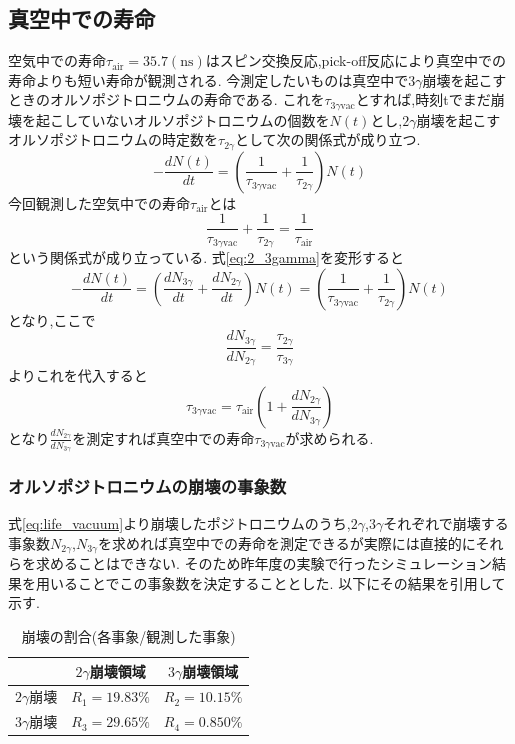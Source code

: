 \subsection{真空中での寿命}
空気中での寿命$\tau_\textrm{air}=35.7(\textrm{ns})$はスピン交換反応,pick-off反応により真空中での寿命よりも短い寿命が観測される.
今測定したいものは真空中で$3\gamma$崩壊を起こすときのオルソポジトロニウムの寿命である.
これを$\tau_{3\gamma\textrm{vac}}$とすれば,時刻tでまだ崩壊を起こしていないオルソポジトロニウムの個数を$N(t)$とし,$2\gamma$崩壊を起こすオルソポジトロニウムの時定数を$\tau_{2\gamma}$として次の関係式が成り立つ.
\begin{equation}
	-\frac{dN(t)}{dt}=\left(\frac{1}{\tau_{3\gamma\textrm{vac}}}+\frac{1}{\tau_{2\gamma}}\right)N(t)
	\label{eq:2_3gamma}
\end{equation}
今回観測した空気中での寿命$\tau_\textrm{air}$とは
\begin{equation}
	\nonumber
	\frac{1}{\tau_{3\gamma\textrm{vac}}}+\frac{1}{\tau_{2\gamma}}=\frac{1}{\tau_\textrm{air}}
\end{equation}
という関係式が成り立っている.
式\ref{eq:2_3gamma}を変形すると
\begin{equation}
	\nonumber
	-\frac{dN(t)}{dt}=\left(\frac{dN_{3\gamma}}{dt}+\frac{dN_{2\gamma}}{dt}\right)N(t)=\left(\frac{1}{\tau_{3\gamma\textrm{vac}}}+\frac{1}{\tau_{2\gamma}}\right)N(t)
\end{equation}
となり,ここで
\begin{equation}
	\nonumber
	\frac{dN_{3\gamma}}{dN_{2\gamma}}=\frac{\tau_{2\gamma}}{\tau_{3\gamma}}
\end{equation}
よりこれを代入すると
\begin{equation}
	\tau_{3\gamma\textrm{vac}}=\tau_\textrm{air}\left(1+\frac{dN_{2\gamma}}{dN_{3\gamma}}\right)
	\label{eq:life_vacuum}
\end{equation}
となり$\frac{dN_{2\gamma}}{dN_{3\gamma}}$を測定すれば真空中での寿命$\tau_{3\gamma \textrm{vac}}$が求められる.

\subsubsection{オルソポジトロニウムの崩壊の事象数}
式\ref{eq:life_vacuum}より崩壊したポジトロニウムのうち,$2\gamma$,$3\gamma$それぞれで崩壊する事象数$N_{2\gamma}$,$N_{3\gamma}$を求めれば真空中での寿命を測定できるが実際には直接的にそれらを求めることはできない.
そのため昨年度の実験で行ったシミュレーション結果を用いることでこの事象数を決定することとした.
以下にその結果を引用して示す.
\begin{table}[htbp]
	\centering
		\caption{崩壊の割合(各事象/観測した事象)}
		\begin{tabular}{|l|c|c|} \hline
			& $2\gamma$崩壊領域 & $3\gamma$崩壊領域 \\ \hline
			$2\gamma$崩壊 & $R_1=19.83\%$ & $R_2=10.15\%$\\
			$3\gamma$崩壊 & $R_3=29.65\%$ & $R_4=0.850\%$\\ \hline
		\end{tabular}
		\label{2_3gamma_ratio}
\end{table}

